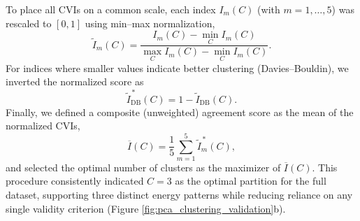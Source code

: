 \documentclass[pdflatex,sn-chicago]{sn-jnl}%
\theoremstyle{plain}
\theoremstyle{definition}
\theoremstyle{remark}
\theoremstyle{definition}
\begin{document}
To place all CVIs on a common scale, each index $I_m(C)$ (with $m=1,\ldots,5$) was rescaled to $[0,1]$ using min--max normalization,
\begin{equation}
\widetilde{I}_m(C) = \frac{I_m(C) - \min\limits_{C} I_m(C)}{\max\limits_{C} I_m(C) - \min\limits_{C} I_m(C)}.
\end{equation}
For indices where smaller values indicate better clustering (Davies--Bouldin), we inverted the normalized score as
\begin{equation}
\widetilde{I}_{\mathrm{DB}}^{\,*}(C) = 1 - \widetilde{I}_{\mathrm{DB}}(C).
\end{equation}
Finally, we defined a composite (unweighted) agreement score as the mean of the normalized CVIs,
\begin{equation}
\overline{I}(C) = \frac{1}{5}\sum_{m=1}^{5}\widetilde{I}_m^{\,*}(C),
\end{equation}
and selected the optimal number of clusters as the maximizer of $\overline{I}(C)$. This procedure consistently indicated $C=3$ as the optimal partition for the full dataset, supporting three distinct energy patterns while reducing reliance on any single validity criterion  (Figure \ref{fig:pca_clustering_validation}b).
\end{document}
